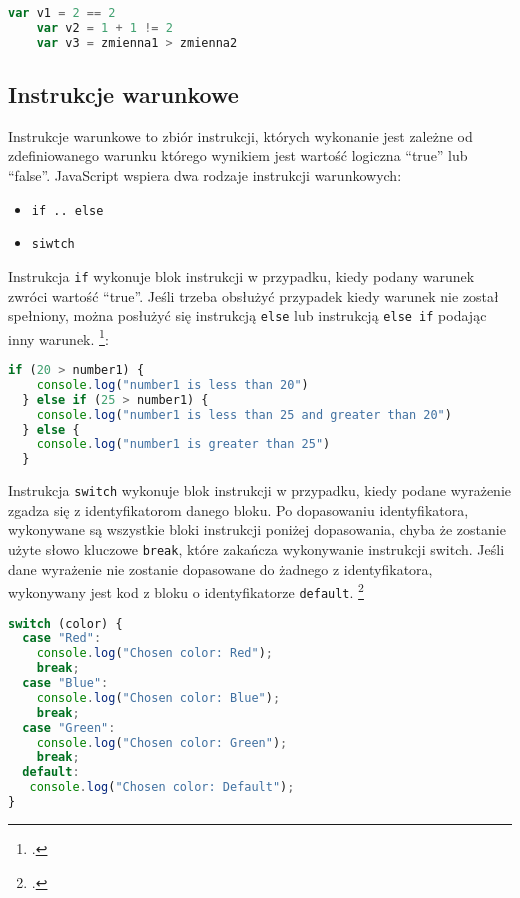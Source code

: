   \newpage
  \begin{lstlisting}[language=JavaScript, caption=Przykład użycia operatorów porównania, label=alg:operatoryPorownania1]
    var v1 = 2 == 2
    var v2 = 1 + 1 != 2
    var v3 = zmienna1 > zmienna2
  \end{lstlisting}

\subsection{Instrukcje warunkowe}
Instrukcje warunkowe to zbiór instrukcji, których wykonanie jest zależne od zdefiniowanego warunku którego wynikiem jest wartość logiczna ``true'' lub ``false''. JavaScript wspiera dwa rodzaje instrukcji warunkowych:
\begin{itemize}
  \item \texttt{if .. else}
  \item \texttt{siwtch}
\end{itemize}
\par Instrukcja \texttt{if} wykonuje blok instrukcji w przypadku, kiedy podany warunek zwróci wartość ``true''. Jeśli trzeba obsłużyć przypadek kiedy warunek nie został spełniony, można posłużyć się instrukcją \texttt{else} lub instrukcją \texttt{else if} podając inny warunek. \footcite{jsControl_flow_and_error_handling}:

\begin{lstlisting}[language=JavaScript, caption=Przykład użycia instrukcji \texttt{if .. else}, label=alg:instrukcjaIfElese1]
  if (20 > number1) {
    console.log("number1 is less than 20")
  } else if (25 > number1) {
    console.log("number1 is less than 25 and greater than 20")
  } else {
    console.log("number1 is greater than 25")
  }
\end{lstlisting}

\par Instrukcja \texttt{switch} wykonuje blok instrukcji w przypadku, kiedy podane wyrażenie zgadza się z identyfikatorom danego bloku. Po dopasowaniu identyfikatora, wykonywane są wszystkie bloki instrukcji poniżej dopasowania, chyba że zostanie użyte słowo kluczowe \texttt{break}, które zakańcza wykonywanie instrukcji switch. Jeśli dane wyrażenie nie zostanie dopasowane do żadnego z identyfikatora, wykonywany jest kod z bloku o identyfikatorze \texttt{default}. \footcite{jsControl_flow_and_error_handling}

\begin{lstlisting}[language=JavaScript, caption=Przykład użycia instrukcji \texttt{switch}, label=alg:instrukcjaSwitch1]
  switch (color) {
  case "Red":
    console.log("Chosen color: Red");
    break;
  case "Blue":
    console.log("Chosen color: Blue");
    break;
  case "Green":
    console.log("Chosen color: Green");
    break;
  default:
   console.log("Chosen color: Default");
}
\end{lstlisting}


